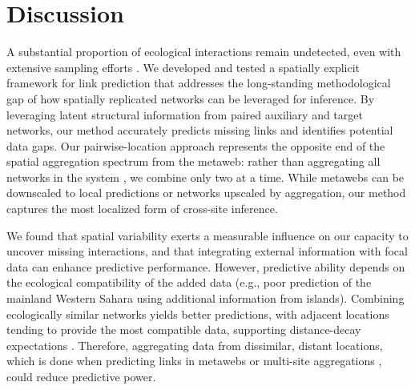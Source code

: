 \documentclass[oneside, a4paper, onecolumn, 11pt]{article}
\begin{document}
\section{Discussion}

A substantial proportion of ecological interactions remain undetected, even with extensive sampling efforts \citep{Chacoff2012-qt,Jordano2016-zj}. We developed and tested a spatially explicit framework for link prediction that addresses the long-standing methodological gap of how spatially replicated networks can be leveraged for inference. By leveraging latent structural information from paired auxiliary and target networks, our method accurately predicts missing links and identifies potential data gaps. Our pairwise-location approach represents the opposite end of the spatial aggregation spectrum from the metaweb: rather than aggregating all networks in the system \citep{Strydom2023-rc}, we combine only two at a time. While metawebs can be downscaled to local predictions \citep{Dansereau2024-wt} or networks upscaled by aggregation, our method captures the most localized form of cross-site inference.

We found that spatial variability exerts a measurable influence on our capacity to uncover missing interactions, and that integrating external information with focal data can enhance predictive performance. However, predictive ability depends on the ecological compatibility of the added data (e.g., poor prediction of the mainland Western Sahara using additional information from islands).
Combining ecologically similar networks yields better predictions, with adjacent locations tending to provide the most compatible data, supporting distance-decay expectations \citep{Soininen2007-mr, Vitali2024-gt, Trojelsgaard2015-aq}. Therefore, aggregating data from dissimilar, distant locations, which is done when predicting links in metawebs \citep{Strydom2023-rc} or multi-site aggregations \citep{Dormann2025-rz}, could reduce predictive power.
\end{document}
